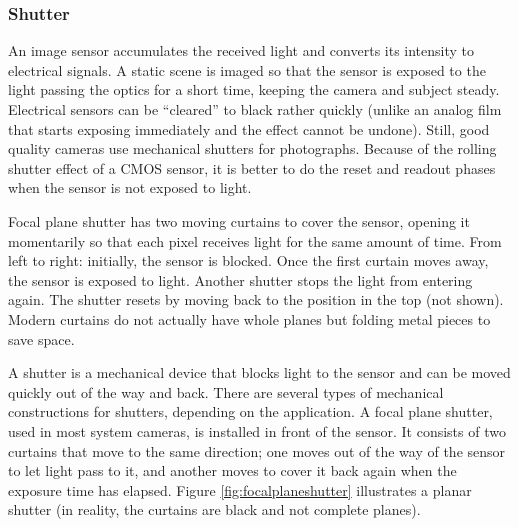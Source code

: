 
\subsubsection{Shutter} %


An image sensor accumulates the received light and converts its intensity to electrical signals.
A static scene is imaged so that the sensor is exposed to the light passing the optics for a short time, keeping the camera and subject steady.
Electrical sensors can be ``cleared'' to black rather quickly (unlike an analog film that starts exposing immediately and the effect cannot be undone). Still, good quality cameras use mechanical shutters for photographs.
Because of the rolling shutter effect of a CMOS sensor, it is better to do the reset and readout phases when the sensor is not exposed to light.


{Focal plane shutter has two moving curtains to cover the sensor, opening it momentarily so that each pixel receives light for the same amount of time.
From left to right: initially, the sensor is blocked.
Once the first curtain moves away, the sensor is exposed to light.
Another shutter stops the light from entering again.
The shutter resets by moving back to the position in the top (not shown).
Modern curtains do not actually have whole planes but folding metal pieces to save space.
}



A shutter is a mechanical device that blocks light to the sensor and can be moved quickly out of the way and back.
There are several types of mechanical constructions for shutters, depending on the application.
A focal plane shutter, used in most system cameras, is installed in front of the sensor.
It consists of two curtains that move to the same direction; one moves out of the way of the sensor to let light pass to it, and another moves to cover it back again when the exposure time has elapsed.
Figure \ref{fig:focalplaneshutter} illustrates a planar shutter (in reality, the curtains are black and not complete planes).


